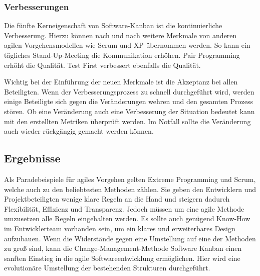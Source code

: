 \subsubsection{Verbesserungen}
Die fünfte Kerneigenschaft von Software-Kanban ist die kontinuierliche Verbesserung. Hierzu können nach und nach weitere Merkmale von anderen agilen Vorgehensmodellen wie Scrum und XP übernommen werden. So kann ein tägliches Stand-Up-Meeting die Kommunikation erhöhen. Pair Programming erhöht die Qualität. Test First verbessert ebenfalls die Qualität. 

Wichtig bei der Einführung der neuen Merkmale ist die Akzeptanz bei allen Beteiligten. Wenn der Verbesserungsprozess zu schnell durchgeführt wird, werden einige Beteiligte sich gegen die Veränderungen wehren und den gesamten Prozess stören. Ob eine Veränderung auch eine Verbesserung der Situation bedeutet kann mit den erstellten Metriken überprüft werden. Im Notfall sollte die Veränderung auch wieder rückgängig gemacht werden können.

\subsection{Ergebnisse}
Als Paradebeispiele für agiles Vorgehen gelten Extreme Programming und Scrum, welche auch zu den beliebtesten Methoden zählen. Sie geben den Entwicklern und Projektbeteiligten wenige klare Regeln an die Hand und steigern dadurch Flexibilität, Effizienz und Transparenz. \cite[S. 28 f.]{bib:wolfRoock} Jedoch müssen um eine agile Methode umzusetzen alle Regeln eingehalten werden. Es sollte auch genügend Know-How im Entwicklerteam vorhanden sein, um ein klares und erweiterbares Design aufzubauen. Wenn die Widerstände gegen eine Umstellung auf eine der Methoden zu groß sind, kann die Change-Manage\-ment-Methode Software Kanban einen sanften Einstieg in die agile Softwareentwicklung ermöglichen. Hier wird eine evolutionäre Umstellung der bestehenden Strukturen durchgeführt.